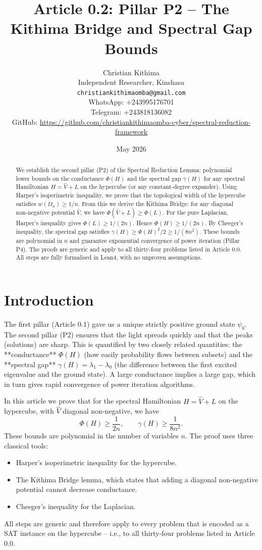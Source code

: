 \documentclass[11pt,a4paper]{article}
\title{Article 0.2: Pillar P2 – The Kithima Bridge and Spectral Gap Bounds}
\author{Christian Kithima \\
Independent Researcher, Kinshasa \\
\texttt{christiankithimaomba@gmail.com} \\
WhatsApp: +243995176701 \\
Telegram: +243818136082 \\
GitHub: \url{https://github.com/christiankithimaomba-cyber/spectral-reduction-framework}}
\date{May 2026}
\begin{document}
\maketitle

\begin{abstract}
We establish the second pillar (P2) of the Spectral Reduction Lemma: polynomial lower bounds on the conductance \(\Phi(H)\) and the spectral gap \(\gamma(H)\) for any spectral Hamiltonian \(H = \hat{V} + L\) on the hypercube (or any constant‑degree expander). Using Harper's isoperimetric inequality, we prove that the topological width of the hypercube satisfies \(w(\Omega_n) \ge 1/n\). From this we derive the Kithima Bridge: for any diagonal non‑negative potential \(\hat{V}\), we have \(\Phi(\hat{V}+L) \ge \Phi(L)\). For the pure Laplacian, Harper's inequality gives \(\Phi(L) \ge 1/(2n)\). Hence \(\Phi(H) \ge 1/(2n)\). By Cheeger's inequality, the spectral gap satisfies \(\gamma(H) \ge \Phi(H)^2/2 \ge 1/(8n^2)\). These bounds are polynomial in \(n\) and guarantee exponential convergence of power iteration (Pillar P4). The proofs are generic and apply to all thirty‑four problems listed in Article 0.0. All steps are fully formalised in Lean4, with no unproven assumptions.
\end{abstract}

\tableofcontents

\section{Introduction}

The first pillar (Article 0.1) gave us a unique strictly positive ground state \(\psi_0\). The second pillar (P2) ensures that the light spreads quickly and that the peaks (solutions) are sharp. This is quantified by two closely related quantities: the **conductance** \(\Phi(H)\) (how easily probability flows between subsets) and the **spectral gap** \(\gamma(H) = \lambda_1 - \lambda_0\) (the difference between the first excited eigenvalue and the ground state). A large conductance implies a large gap, which in turn gives rapid convergence of power iteration algorithms.

In this article we prove that for the spectral Hamiltonian \(H = \hat{V} + L\) on the hypercube, with \(\hat{V}\) diagonal non‑negative, we have
\[
\Phi(H) \ge \frac{1}{2n},\qquad \gamma(H) \ge \frac{1}{8n^2}.
\]
These bounds are polynomial in the number of variables \(n\). The proof uses three classical tools:
\begin{itemize}
\item Harper's isoperimetric inequality for the hypercube.
\item The Kithima Bridge lemma, which states that adding a diagonal non‑negative potential cannot decrease conductance.
\item Cheeger's inequality for the Laplacian.
\end{itemize}
All steps are generic and therefore apply to every problem that is encoded as a SAT instance on the hypercube – i.e., to all thirty‑four problems listed in Article 0.0.
\end{document}
